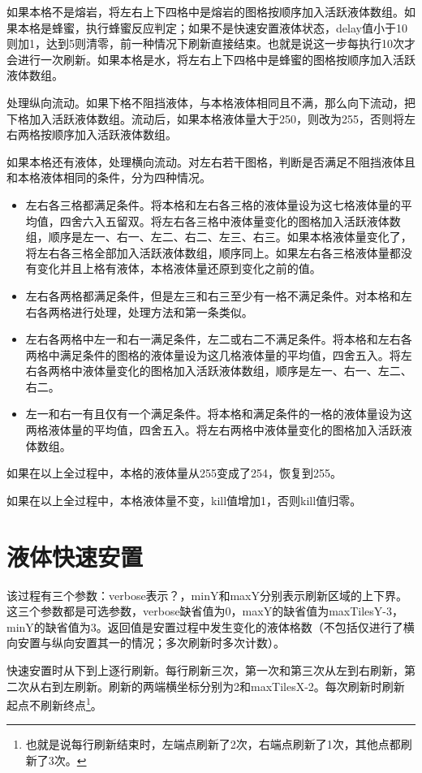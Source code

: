 如果本格不是熔岩，将左右上下四格中是熔岩的图格按顺序加入活跃液体数组。如果本格是蜂蜜，执行蜂蜜反应判定；如果不是快速安置液体状态，delay值小于10则加1，达到5则清零，前一种情况下刷新直接结束。也就是说这一步每执行10次才会进行一次刷新。如果本格是水，将左右上下四格中是蜂蜜的图格按顺序加入活跃液体数组。

处理纵向流动。如果下格不阻挡液体，与本格液体相同且不满，那么向下流动，把下格加入活跃液体数组。流动后，如果本格液体量大于250，则改为255，否则将左右两格按顺序加入活跃液体数组。

如果本格还有液体，处理横向流动。对左右若干图格，判断是否满足不阻挡液体且和本格液体相同的条件，分为四种情况。
\begin{itemize}
    \item 左右各三格都满足条件。将本格和左右各三格的液体量设为这七格液体量的平均值，四舍六入五留双。将左右各三格中液体量变化的图格加入活跃液体数组，顺序是左一、右一、左二、右二、左三、右三。如果本格液体量变化了，将左右各三格全部加入活跃液体数组，顺序同上。如果左右各三格液体量都没有变化并且上格有液体，本格液体量还原到变化之前的值。
    \item 左右各两格都满足条件，但是左三和右三至少有一格不满足条件。对本格和左右各两格进行处理，处理方法和第一条类似。
    \item 左右各两格中左一和右一满足条件，左二或右二不满足条件。将本格和左右各两格中满足条件的图格的液体量设为这几格液体量的平均值，四舍五入。将左右各两格中液体量变化的图格加入活跃液体数组，顺序是左一、右一、左二、右二。
    \item 左一和右一有且仅有一个满足条件。将本格和满足条件的一格的液体量设为这两格液体量的平均值，四舍五入。将左右两格中液体量变化的图格加入活跃液体数组。
\end{itemize}

如果在以上全过程中，本格的液体量从255变成了254，恢复到255。

如果在以上全过程中，本格液体量不变，kill值增加1，否则kill值归零。

\section{液体快速安置}
该过程有三个参数：verbose表示？，minY和maxY分别表示刷新区域的上下界。这三个参数都是可选参数，verbose缺省值为0，maxY的缺省值为maxTilesY-3，minY的缺省值为3。返回值是安置过程中发生变化的液体格数（不包括仅进行了横向安置与纵向安置其一的情况；多次刷新时多次计数）。

快速安置时从下到上逐行刷新。每行刷新三次，第一次和第三次从左到右刷新，第二次从右到左刷新。刷新的两端横坐标分别为2和maxTilesX-2。每次刷新时刷新起点不刷新终点\footnote{也就是说每行刷新结束时，左端点刷新了2次，右端点刷新了1次，其他点都刷新了3次。}。

